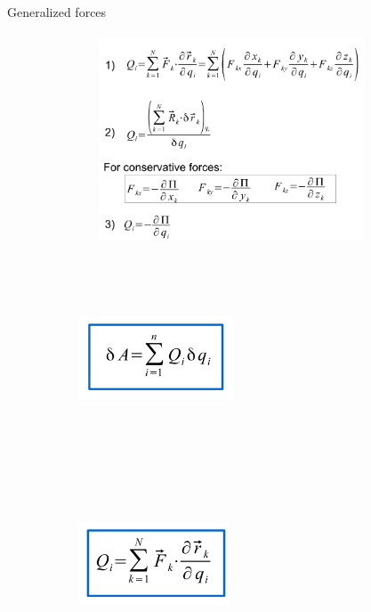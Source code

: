 \documentclass[aspectratio=169]{beamer}
\begin{document}
\begin{frame}[t]{Generalized forces
}
\framesubtitle{}
    \vspace{-0.6cm}
    \begin{figure}[H]
        \begin{subfigure}{0.49\textwidth}
            \centering\includegraphics[height=6cm,width=1\textwidth,keepaspectratio]{image12.png}
            \label{fig:image12}
        \end{subfigure}
        \begin{subfigure}{0.49\textwidth}
            \centering\includegraphics[height=6cm,width=0.51\textwidth,keepaspectratio]{image20.png}
            \label{fig:image20}
            \centering\includegraphics[height=6cm,width=0.49\textwidth,keepaspectratio]{image10.png}
            \label{fig:image10}

\end{subfigure}
\end{figure}
\end{frame}
\end{document}

